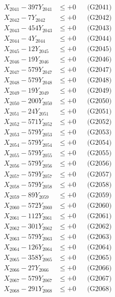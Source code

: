 \documentclass[a4paper,10pt]{article}
\begin{document}
{\begin{align}
\allowbreak
X_{2041} - 397Y_{2041} &\leq +0 && \text{(G2041)} \\
X_{2042} - 7Y_{2042} &\leq +0 && \text{(G2042)} \\
X_{2043} - 454Y_{2043} &\leq +0 && \text{(G2043)} \\
X_{2044} - 4Y_{2044} &\leq +0 && \text{(G2044)} \\
X_{2045} - 12Y_{2045} &\leq +0 && \text{(G2045)} \\
X_{2046} - 19Y_{2046} &\leq +0 && \text{(G2046)} \\
X_{2047} - 579Y_{2047} &\leq +0 && \text{(G2047)} \\
X_{2048} - 579Y_{2048} &\leq +0 && \text{(G2048)} \\
X_{2049} - 19Y_{2049} &\leq +0 && \text{(G2049)} \\
X_{2050} - 200Y_{2050} &\leq +0 && \text{(G2050)} \\
\allowbreak
X_{2051} - 24Y_{2051} &\leq +0 && \text{(G2051)} \\
X_{2052} - 571Y_{2052} &\leq +0 && \text{(G2052)} \\
X_{2053} - 579Y_{2053} &\leq +0 && \text{(G2053)} \\
X_{2054} - 579Y_{2054} &\leq +0 && \text{(G2054)} \\
X_{2055} - 579Y_{2055} &\leq +0 && \text{(G2055)} \\
X_{2056} - 579Y_{2056} &\leq +0 && \text{(G2056)} \\
X_{2057} - 579Y_{2057} &\leq +0 && \text{(G2057)} \\
X_{2058} - 579Y_{2058} &\leq +0 && \text{(G2058)} \\
X_{2059} - 89Y_{2059} &\leq +0 && \text{(G2059)} \\
X_{2060} - 572Y_{2060} &\leq +0 && \text{(G2060)} \\
\allowbreak
X_{2061} - 112Y_{2061} &\leq +0 && \text{(G2061)} \\
X_{2062} - 301Y_{2062} &\leq +0 && \text{(G2062)} \\
X_{2063} - 579Y_{2063} &\leq +0 && \text{(G2063)} \\
X_{2064} - 126Y_{2064} &\leq +0 && \text{(G2064)} \\
X_{2065} - 358Y_{2065} &\leq +0 && \text{(G2065)} \\
X_{2066} - 27Y_{2066} &\leq +0 && \text{(G2066)} \\
X_{2067} - 579Y_{2067} &\leq +0 && \text{(G2067)} \\
X_{2068} - 291Y_{2068} &\leq +0 && \text{(G2068)} \\

\end{align}}
\end{document}
